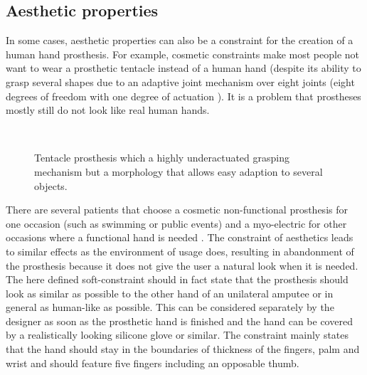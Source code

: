 \documentclass[main]{subfiles}
\begin{document}
\subsection{Aesthetic properties}
 
In some cases, aesthetic properties can also be a constraint for the creation of a human hand prosthesis. For example, cosmetic constraints make most people not want to wear a prosthetic tentacle instead of a human hand (despite its ability to grasp several shapes due to an adaptive joint mechanism over eight joints (eight degrees of freedom with one degree of actuation \cite{TentacleProsthesis}). It is a problem that prostheses mostly still do not look like real human hands.


\begin{figure}[H]
\hspace{0.15\textwidth}
\\
\hspace{0.15\textwidth}
\caption[Tentacle prosthesis]{Tentacle prosthesis which a highly underactuated grasping mechanism but a morphology that allows easy adaption to several objects.}
\label{tentacle-prosthesis}
\end{figure}

There are several patients that choose a cosmetic non-functional prosthesis for one occasion (such as swimming or public events) and a myo-electric for other occasions where a functional hand is needed \cite{Crandall2002,Leow2001,Trost1983,Datta1989,Mendez1985}. The constraint of aesthetics leads to similar effects as the environment of usage does, resulting in abandonment of the prosthesis because it does not give the user a natural look when it is needed. The here defined soft-constraint should in fact state that the prosthesis should look as similar as possible to the other hand of an unilateral amputee or in general as human-like as possible. This can be considered separately by the designer as soon as the prosthetic hand is finished and the hand can be covered by a realistically looking silicone glove or similar. The constraint mainly states that the hand should stay in the boundaries of thickness of the fingers, palm and wrist and should feature five fingers including an opposable thumb.
\end{document}
